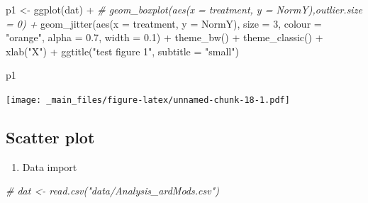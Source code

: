 \documentclass[
]{book}
\newenvironment{Shaded}{\begin{snugshade}}{\end{snugshade}}
\newcommand{\AttributeTok}[1]{\textcolor[rgb]{0.77,0.63,0.00}{#1}}
\newcommand{\CommentTok}[1]{\textcolor[rgb]{0.56,0.35,0.01}{\textit{#1}}}
\newcommand{\DecValTok}[1]{\textcolor[rgb]{0.00,0.00,0.81}{#1}}
\newcommand{\FloatTok}[1]{\textcolor[rgb]{0.00,0.00,0.81}{#1}}
\newcommand{\FunctionTok}[1]{\textcolor[rgb]{0.00,0.00,0.00}{#1}}
\newcommand{\NormalTok}[1]{#1}
\newcommand{\OtherTok}[1]{\textcolor[rgb]{0.56,0.35,0.01}{#1}}
\newcommand{\SpecialCharTok}[1]{\textcolor[rgb]{0.00,0.00,0.00}{#1}}
\newcommand{\StringTok}[1]{\textcolor[rgb]{0.31,0.60,0.02}{#1}}
\providecommand{\tightlist}{%
  \setlength{\itemsep}{0pt}\setlength{\parskip}{0pt}}
\begin{document}
\begin{Shaded}
\begin{Highlighting}[]
\NormalTok{p1 }\OtherTok{\textless{}{-}} \FunctionTok{ggplot}\NormalTok{(dat) }\SpecialCharTok{+}
  \CommentTok{\# geom\_boxplot(aes(x = treatment, y = NormY),outlier.size = 0) +}
  \FunctionTok{geom\_jitter}\NormalTok{(}\FunctionTok{aes}\NormalTok{(}\AttributeTok{x =}\NormalTok{ treatment, }\AttributeTok{y =}\NormalTok{ NormY), }\AttributeTok{size =} \DecValTok{3}\NormalTok{, }\AttributeTok{colour =} \StringTok{"orange"}\NormalTok{, }\AttributeTok{alpha =} \FloatTok{0.7}\NormalTok{, }\AttributeTok{width =} \FloatTok{0.1}\NormalTok{) }\SpecialCharTok{+}
  \FunctionTok{theme\_bw}\NormalTok{() }\SpecialCharTok{+} 
  \FunctionTok{theme\_classic}\NormalTok{() }\SpecialCharTok{+}
  \FunctionTok{xlab}\NormalTok{(}\StringTok{"X"}\NormalTok{) }\SpecialCharTok{+}
  \FunctionTok{ggtitle}\NormalTok{(}\StringTok{"test figure 1"}\NormalTok{, }\AttributeTok{subtitle =} \StringTok{"small"}\NormalTok{)}


\NormalTok{p1}
\end{Highlighting}
\end{Shaded}

\texttt{[image: \_main\_files/figure-latex/unnamed-chunk-18-1.pdf]}

\begin{Shaded}
\end{Shaded}

\hypertarget{scatter-plot}{%
\subsection{Scatter plot}\label{scatter-plot}}

\begin{enumerate}
\def\labelenumi{\arabic{enumi}.}
\setcounter{enumi}{2}
\tightlist
\item
  Data import
\end{enumerate}

\begin{Shaded}
\begin{Highlighting}[]
\CommentTok{\# dat \textless{}{-} read.csv("data/Analysis\_ardMods.csv")}
\end{Highlighting}
\end{Shaded}
\end{document}
